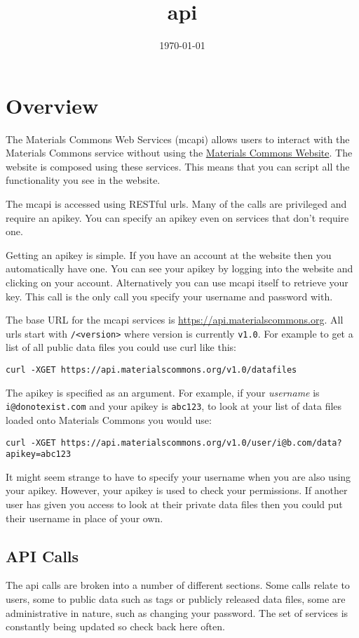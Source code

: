 \documentclass[11pt]{article}
\date{\today}
\title{api}
\begin{document}
\maketitle
\tableofcontents


\section{Overview}
\label{sec-1}
The Materials Commons Web Services (mcapi) allows users to interact with the
Materials Commons service without using the \href{http://materialscommons.org}{Materials Commons Website}. The
website is composed using these services. This means that you can script
all the functionality you see in the website.

The mcapi is accessed using RESTful urls. Many of the calls are privileged
and require an apikey. You can specify an apikey even on services that don't
require one.

Getting an apikey is simple. If you have an account at the website then you
automatically have one. You can see your apikey by logging into the website
and clicking on your account. Alternatively you can use mcapi itself to
retrieve your key. This call is the only call you specify your username and
password with.

The base URL for the mcapi services is \url{https://api.materialscommons.org}. All
urls start with \texttt{/<version>} where version is currently \texttt{v1.0}.
For example to get a list of all public data files you could use curl like this:
\begin{verbatim}
curl -XGET https://api.materialscommons.org/v1.0/datafiles
\end{verbatim}

The apikey is specified as an argument. For example, if your \emph{username} is \texttt{i@donotexist.com}
and your apikey is \texttt{abc123}, to look at your list of data files loaded onto
Materials Commons you would use:
\begin{verbatim}
curl -XGET https://api.materialscommons.org/v1.0/user/i@b.com/data?apikey=abc123
\end{verbatim}

It might seem strange to have to specify your username when you are also using your
apikey. However, your apikey is used to check your permissions. If another user has
given you access to look at their private data files then you could put their username
in place of your own.

\subsection{API Calls}
\label{sec-1-1}
The api calls are broken into a number of different sections. Some calls relate
to users, some to public data such as tags or publicly released data files, some
are administrative in nature, such as changing your password. The set of services
is constantly being updated so check back here often.
\end{document}
